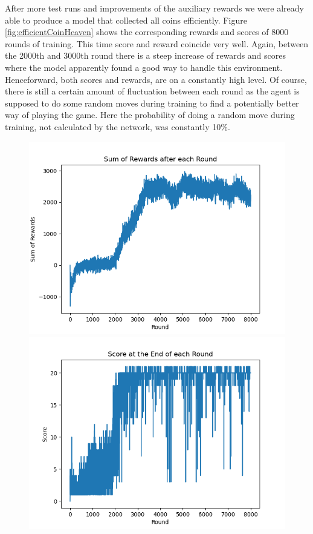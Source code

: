 After more test runs and improvements of the auxiliary rewards we were already able to produce a model that collected all coins efficiently. Figure \ref{fig:efficientCoinHeaven} shows the corresponding rewards and scores of 8000 rounds of training. This time score and reward coincide very well. Again, between the 2000th and 3000th round there is a steep increase of rewards and scores where the model apparently found a good way to handle this environment. Henceforward, both scores and rewards, are on a constantly high level. Of course, there is still a certain amount of fluctuation between each round as the agent is supposed to do some random moves during training to find a potentially better way of playing the game. Here the probability of doing a random move during training, not calculated by the network, was constantly 10\%.
\begin{figure}[H]
	\centering
	\begin{minipage}{0.49\textwidth}
		\centering
		\includegraphics[scale=0.52]{images/rewards_perfect_coinheaven.png}
	\end{minipage}
	\begin{minipage}{0.49\textwidth}
		\centering
		\includegraphics[scale=0.52]{images/scores_perfect_coinheaven.png}

\end{minipage}
\end{figure}
